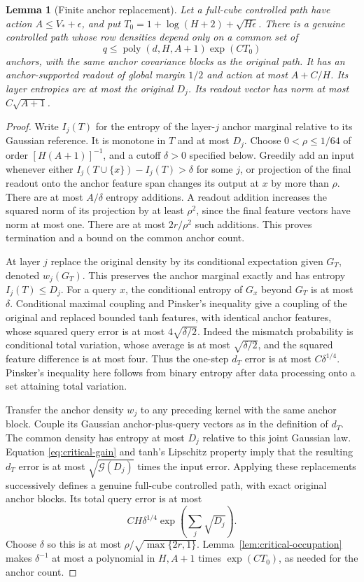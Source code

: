 \documentclass[11pt]{article}
\newtheorem{lemma}[theorem]{Lemma}
\theoremstyle{remark}
\newcommand{\poly}{\operatorname{poly}}
\newcommand{\Gain}{\mathcal G}
\begin{document}
\begin{lemma}[Finite anchor replacement]
\label{lem:critical-anchors}
Let a full-cube controlled path have action $A\le V_*+\epsilon$,
and put $T_0=1+\log(H+2)+\sqrt{H\epsilon}$.
There is a genuine controlled path whose row densities depend only
on a common set of
\[
 q\le\poly(d,H,A+1)\exp(CT_0)
\]
anchors, with the same anchor covariance blocks as the original
path. It has an anchor-supported readout of global margin $1/2$
and action at most $A+C/H$. Its layer entropies are at most the
original $D_j$. Its readout vector has norm at most $C\sqrt{A+1}$.
\end{lemma}
\begin{proof}
Write $I_j(T)$ for the entropy of the layer-$j$ anchor marginal
relative to its Gaussian reference. It is monotone in $T$ and at
most $D_j$. Choose $0<\rho\le1/64$ of order
$[H(A+1)]^{-1}$, and a cutoff $\delta>0$ specified below.
Greedily add an input whenever either
$I_j(T\cup\{x\})-I_j(T)>\delta$ for some $j$, or projection of
the final readout onto the anchor feature span changes its output
at $x$ by more than $\rho$. There are at most
$A/\delta$ entropy additions. A readout addition increases the
squared norm of its projection by at least $\rho^2$, since the
final feature vectors have norm at most one. There are at most
$2r/\rho^2$ such additions. This proves termination and a bound
on the common anchor count.

At layer $j$ replace the original density by its conditional
expectation given $G_T$, denoted $w_j(G_T)$. This preserves the
anchor marginal exactly and has entropy $I_j(T)\le D_j$.
For a query $x$, the conditional entropy of $G_x$ beyond $G_T$
is at most $\delta$. Conditional maximal coupling and Pinsker's
inequality give a coupling of the original and replaced bounded
tanh features, with identical anchor features, whose squared query
error is at most $4\sqrt{\delta/2}$. Indeed the mismatch probability
is conditional total variation, whose average is at most
$\sqrt{\delta/2}$, and the squared feature difference is at most
four. Thus the one-step $d_T$ error is at most $C\delta^{1/4}$.
Pinsker's inequality here follows from binary entropy after data
processing onto a set attaining total variation.

Transfer the anchor density $w_j$ to any preceding kernel with the
same anchor block. Couple its Gaussian anchor-plus-query vectors
as in the definition of $d_T$. The common density has entropy at
most $D_j$ relative to this joint Gaussian law. Equation
\eqref{eq:critical-gain} and tanh's Lipschitz property imply that
the resulting $d_T$ error is at most
$\sqrt{\Gain(D_j)}$ times the input error. Applying these
replacements successively defines a genuine full-cube controlled
path, with exact original anchor blocks. Its total query error is
at most
\[
 C H\delta^{1/4}\exp\left(\sum_j\sqrt{D_j}\right).
\]
Choose $\delta$ so this is at most
$\rho/\sqrt{\max\{2r,1\}}$.
Lemma~\ref{lem:critical-occupation} makes $\delta^{-1}$ at most a
polynomial in $H,A+1$ times $\exp(CT_0)$, as needed for the anchor
count.


\end{proof}
\end{document}
